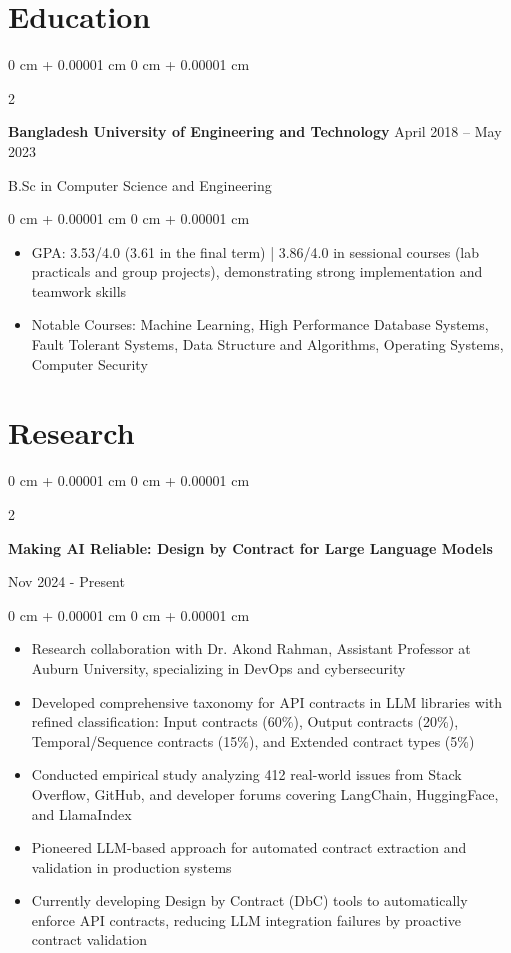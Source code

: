 \documentclass[10pt, letterpaper]{article}
\newenvironment{highlights}{
    \begin{itemize}[
        topsep=0.10 cm,
        parsep=0.10 cm,
        partopsep=0pt,
        itemsep=0pt,
        leftmargin=0 cm + 10pt
    ]
}{
    \end{itemize}
} %
\newenvironment{onecolentry}{
    \begin{adjustwidth}{
        0 cm + 0.00001 cm
    }{
        0 cm + 0.00001 cm
    }
}{
    \end{adjustwidth}
} %
\newenvironment{twocolentry}[2][]{
    \onecolentry
    \def\secondColumn{#2}
    \setcolumnwidth{\fill, 4.5 cm}
    \begin{paracol}{2}
}{
    \switchcolumn \raggedleft \secondColumn
    \end{paracol}
    \endonecolentry
} %
\begin{document}
        \vspace{0.2 cm}
    
    \section{Education}
 
        \begin{twocolentry}{
            April 2018 – May 2023
        }
            \textbf{Bangladesh University of Engineering and Technology}\end{twocolentry}
        B.Sc in Computer Science and Engineering


        \vspace{0.10 cm}
        \begin{onecolentry}
            \begin{highlights}
                \item GPA: 3.53/4.0 (3.61 in the final term) | 3.86/4.0 in sessional courses (lab practicals and group projects), demonstrating strong implementation and teamwork skills
                \item Notable Courses: Machine Learning, High Performance Database Systems, Fault Tolerant Systems, Data Structure and Algorithms, Operating Systems, Computer Security
                \end{highlights}
        \end{onecolentry}
                
        
\section{Research}

\begin{twocolentry}{
    Nov 2024 - Present
}
\textbf{Making AI Reliable: Design by Contract for Large Language Models}
\end{twocolentry}

\begin{onecolentry}
    \begin{highlights}
        \item Research collaboration with Dr. Akond Rahman, Assistant Professor at Auburn University, specializing in DevOps and cybersecurity
        \item Developed comprehensive taxonomy for API contracts in LLM libraries with refined classification: Input contracts (60\%), Output contracts (20\%), Temporal/Sequence contracts (15\%), and Extended contract types (5\%)
        \item Conducted empirical study analyzing 412 real-world issues from Stack Overflow, GitHub, and developer forums covering LangChain, HuggingFace, and LlamaIndex
        \item Pioneered LLM-based approach for automated contract extraction and validation in production systems
        \item Currently developing Design by Contract (DbC) tools to automatically enforce API contracts, reducing LLM integration failures by proactive contract validation
    \end{highlights}
\end{onecolentry}
\end{document}

